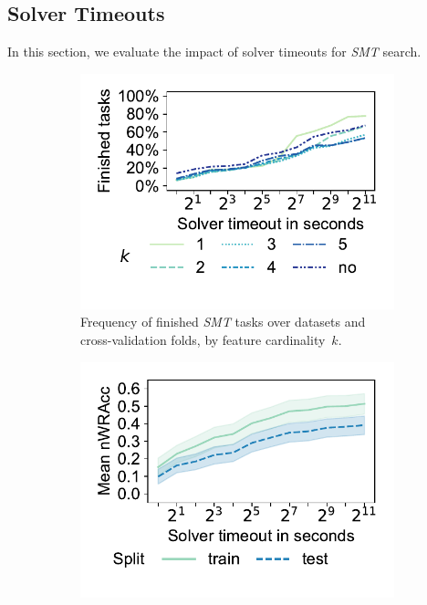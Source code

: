 \documentclass{article}
\theoremstyle{definition}
\begin{document}
\subsection{Solver Timeouts}
\label{sec:csd:evaluation:timeouts}

In this section, we evaluate the impact of solver timeouts for \emph{SMT} search.

\begin{figure}[t]
	\centering
	\begin{subfigure}[t]{0.48\textwidth}
		\centering
		\includegraphics[width=\textwidth, trim=15 25 15 10, clip]{plots/csd-timeouts-finished-tasks.pdf}
		\caption{
			Frequency of finished \emph{SMT} tasks over datasets and cross-validation folds, by feature cardinality~$k$.
		}
		\label{fig:csd:timeouts-finished-tasks}
	\end{subfigure}
	\hfill
	\begin{subfigure}[t]{0.48\textwidth}
		\centering
		\includegraphics[width=\textwidth, trim=15 25 15 10, clip]{plots/csd-timeouts-nwracc.pdf}

\end{subfigure}
\end{figure}
\end{document}
